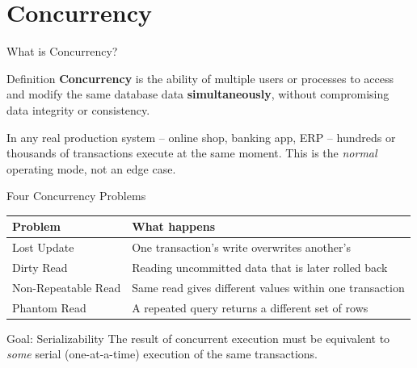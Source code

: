 \section{Concurrency}

\begin{frame}{What is Concurrency?}
  \begin{block}{Definition}
    \textbf{Concurrency} is the ability of multiple users or processes to access
    and modify the same database data \textbf{simultaneously}, without compromising
    data integrity or consistency.
  \end{block}

  In any real production system -- online shop, banking app, ERP -- hundreds or
  thousands of transactions execute at the same moment. This is the \emph{normal}
  operating mode, not an edge case.

  \begin{block}{Four Concurrency Problems}
    \begin{tabular}{@{}ll@{}}
      \toprule
      \textbf{Problem} & \textbf{What happens} \\
      \midrule
      Lost Update          & One transaction's write overwrites another's \\
      Dirty Read           & Reading uncommitted data that is later rolled back \\
      Non-Repeatable Read  & Same read gives different values within one transaction \\
      Phantom Read         & A repeated query returns a different set of rows \\
      \bottomrule
    \end{tabular}
  \end{block}

  \begin{block}{Goal: Serializability}
    The result of concurrent execution must be equivalent to \emph{some} serial
    (one-at-a-time) execution of the same transactions.
  \end{block}
\end{frame}

